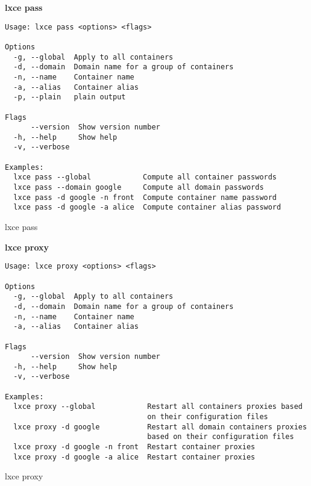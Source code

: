 \newpage
\textbf{lxce pass}
\begin{listing}[H]
\begin{verbatim}
Usage: lxce pass <options> <flags>

Options
  -g, --global  Apply to all containers                               
  -d, --domain  Domain name for a group of containers                 
  -n, --name    Container name                                        
  -a, --alias   Container alias                                       
  -p, --plain   plain output                                          

Flags
      --version  Show version number                                  
  -h, --help     Show help                                            
  -v, --verbose

Examples:
  lxce pass --global            Compute all container passwords
  lxce pass --domain google     Compute all domain passwords
  lxce pass -d google -n front  Compute container name password
  lxce pass -d google -a alice  Compute container alias password

\end{verbatim}
\caption{lxce pass}
\label{listings: lxce pass}
\end{listing}

\newpage
\textbf{lxce proxy}
\begin{listing}[H]
\begin{verbatim}
Usage: lxce proxy <options> <flags>

Options
  -g, --global  Apply to all containers                                
  -d, --domain  Domain name for a group of containers                  
  -n, --name    Container name                                         
  -a, --alias   Container alias                                        

Flags
      --version  Show version number                                   
  -h, --help     Show help                                             
  -v, --verbose

Examples:
  lxce proxy --global            Restart all containers proxies based 
                                 on their configuration files
  lxce proxy -d google           Restart all domain containers proxies 
                                 based on their configuration files
  lxce proxy -d google -n front  Restart container proxies
  lxce proxy -d google -a alice  Restart container proxies
\end{verbatim}
\caption{lxce proxy}
\label{listings: lxce proxy}
\end{listing}


